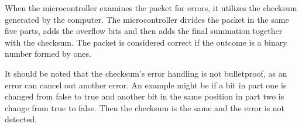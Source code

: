 When the microcontroller examines the packet for errors, it utilizes the checksum generated by the computer. The microcontroller divides the packet in the same five parts, adds the overflow bits and then adds the final summation together with the checksum. The packet is considered correct if the outcome is a binary number formed by ones.

It should be noted that the checksum's error handling is not bulletproof, as an error can cancel out another error. An example might be if a bit in part one is changed from false to true and another bit in the same position in part two is change from true to false. Then the checksum is the same and the error is not detected. 

